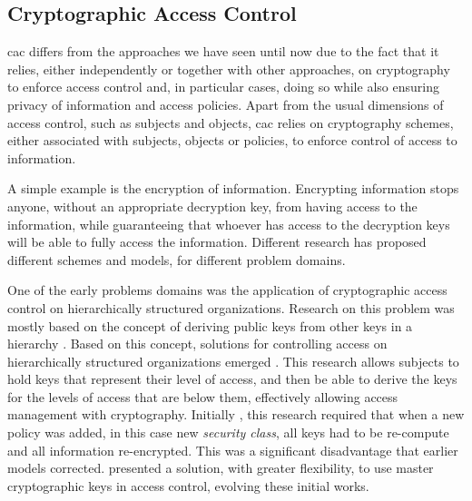\subsection{Cryptographic Access Control}

\gls{cac} differs from the approaches we have seen until now due to the fact that it relies, either independently or together with other approaches, on cryptography to enforce access control and, in particular cases, doing so while also ensuring privacy of information and access policies. Apart from the usual dimensions of access control, such as subjects and objects, \gls{cac} relies on cryptography schemes, either associated with subjects, objects or policies, to enforce control of access to information.

A simple example is the encryption of information. Encrypting information stops anyone, without an appropriate decryption key, from having access to the information, while guaranteeing that whoever has access to the decryption keys will be able to fully access the information. Different research has proposed different schemes and models, for different problem domains.

One of the early problems domains was the application of cryptographic access control on hierarchically structured organizations. Research on this problem was mostly based on the concept of deriving public keys from other keys in a hierarchy \cite{denning_master_1981}. Based on this concept, solutions for controlling access on hierarchically structured organizations emerged \cite{akl_cryptographic_1983, sandhu_cryptographic_1988}. This research allows subjects to hold keys that represent their level of access, and then be able to derive the keys for the levels of access that are below them, effectively allowing access management with cryptography. Initially \cite{akl_cryptographic_1983}, this research required that when a new policy was added, in this case new \emph{security class}, all keys had to be re-compute and all information re-encrypted. This was a significant disadvantage that earlier models \cite{sandhu_cryptographic_1988} corrected. \citeauthor{brassard_flexible_1990} \cite{brassard_flexible_1990} presented a solution, with greater flexibility, to use master cryptographic keys in access control, evolving these initial works.

